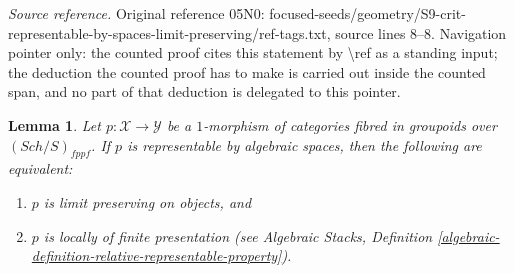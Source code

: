 \documentclass{stacks-project}
\theoremstyle{plain}
\newtheorem{lemma}[subsection]{Lemma}
\theoremstyle{definition}
\theoremstyle{remark}
\numberwithin{equation}{subsection}
\def\Sch{\mathit{Sch}}
\begin{document}
\noindent\textit{Source reference.} Original reference 05N0: focused-seeds/geometry/S9-crit-representable-by-spaces-limit-preserving/ref-tags.txt, source lines 8--8. Navigation pointer only: the counted proof cites this statement by \textbackslash{}ref as a standing input; the deduction the counted proof has to make is carried out inside the counted span, and no part of that deduction is delegated to this pointer.\par\medskip
\begin{lemma}
\label{lemma-representable-by-spaces-limit-preserving}
Let $p : \mathcal{X} \to \mathcal{Y}$ be a $1$-morphism of categories
fibred in groupoids over $(\Sch/S)_{fppf}$. If $p$ is
representable by algebraic spaces, then the following are equivalent:
\begin{enumerate}
\item $p$ is limit preserving on objects, and
\item $p$ is locally of finite presentation (see
Algebraic Stacks,
Definition \ref{algebraic-definition-relative-representable-property}).
\end{enumerate}
\end{lemma}
\end{document}
